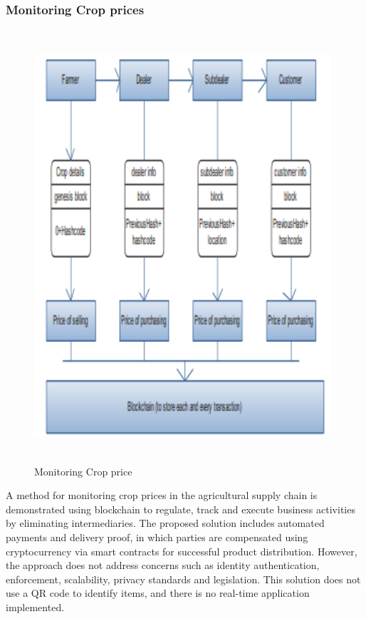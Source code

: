 \documentclass[12pt,a4paper,twocolumn,fleqn]{article}
\begin{document}
\subsubsection{Monitoring Crop prices}
\begin{figure} [H]
\includegraphics[width=11cm,height=16cm]{media/Supplychain_Model.png}
\centering
\caption{Monitoring Crop price}
\end{figure}
A method for monitoring crop prices in the agricultural supply chain is demonstrated using blockchain to regulate, track and execute business activities by eliminating intermediaries. The proposed solution includes automated payments and delivery proof, in which parties are compensated using cryptocurrency via smart contracts for successful product distribution. However, the approach does not address concerns such as identity authentication, enforcement, scalability, privacy standards and legislation. This solution does not use a QR code to identify items, and there is no real-time application implemented. 
\end{document}
